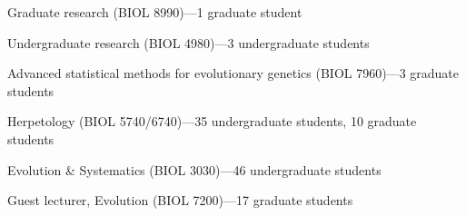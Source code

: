 \begin{tightItemize}
    \item Graduate research (BIOL 8990)---1 graduate student
    \item Undergraduate research (BIOL 4980)---3 undergraduate students
    \item Advanced statistical methods for evolutionary genetics (BIOL 7960)---3 graduate students
    \item Herpetology (BIOL 5740/6740)---35 undergraduate students, 10 graduate students
    \item Evolution \& Systematics (BIOL 3030)---46 undergraduate students
    \item Guest lecturer, Evolution (BIOL 7200)---17 graduate students
\end{tightItemize}
